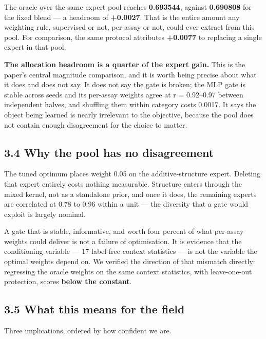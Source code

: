 The oracle over the same expert pool reaches \textbf{0.693544}, against \textbf{0.690808} for the fixed blend --- a
headroom of \textbf{+0.0027}. That is the entire amount any weighting rule, supervised or not, per-assay or
not, could ever extract from this pool. For comparison, the same protocol attributes \textbf{+0.0077} to
replacing a single expert in that pool.

\textbf{The allocation headroom is a quarter of the expert gain.} This is the paper's central magnitude
comparison, and it is worth being precise about what it does and does not say. It does not say the gate
is broken; the MLP gate is stable across seeds and its per-assay weights agree at r = 0.92--0.97 between
independent halves, and shuffling them within category costs 0.0017. It says the object being learned
is nearly irrelevant to the objective, because the pool does not contain enough disagreement for the
choice to matter.

\hypertarget{why-the-pool-has-no-disagreement}{%
\subsection{3.4 Why the pool has no disagreement}\label{why-the-pool-has-no-disagreement}}

The tuned optimum places weight 0.05 on the additive-structure expert. Deleting that expert entirely
costs nothing measurable. Structure enters through the mixed kernel, not as a standalone prior, and once
it does, the remaining experts are correlated at 0.78 to 0.96 within a unit --- the diversity that a gate
would exploit is largely nominal.

A gate that is stable, informative, and worth four percent of what per-assay weights could deliver is
not a failure of optimisation. It is evidence that the conditioning variable --- 17 label-free context
statistics --- is not the variable the optimal weights depend on. We verified the direction of that
mismatch directly: regressing the oracle weights on the same context statistics, with leave-one-out
protection, scores \textbf{below the constant}.

\hypertarget{what-this-means-for-the-field}{%
\subsection{3.5 What this means for the field}\label{what-this-means-for-the-field}}

Three implications, ordered by how confident we are.

